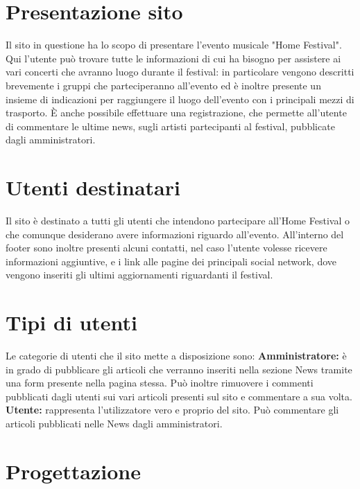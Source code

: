\documentclass[10pt, a4paper]{article}
\begin{document}
\newpage
\hypersetup{hidelinks}
\tableofcontents
\newpage







\section{Presentazione sito}
Il sito in questione ha lo scopo di presentare l'evento musicale "Home Festival". Qui l'utente può trovare tutte le informazioni di cui ha bisogno per assistere ai vari concerti che avranno luogo durante il festival: in particolare vengono descritti brevemente i gruppi che parteciperanno all'evento ed è inoltre presente un insieme di indicazioni per raggiungere il luogo dell'evento con i principali mezzi di trasporto.
È anche possibile effettuare una registrazione, che permette all'utente di commentare le ultime news, sugli artisti partecipanti al festival, pubblicate dagli amministratori. 

\section{Utenti destinatari}
Il sito è destinato a tutti gli utenti che intendono partecipare all’Home Festival o che comunque desiderano avere informazioni riguardo all’evento.  
All’interno del footer sono inoltre presenti alcuni contatti, nel caso l’utente volesse ricevere informazioni aggiuntive, e i link alle pagine dei principali social network, dove vengono inseriti gli ultimi aggiornamenti riguardanti il festival.

\section{Tipi di utenti}
Le categorie di utenti che il sito mette a disposizione sono:
\newline \textbf{Amministratore: }è in grado di pubblicare gli articoli che verranno inseriti nella sezione News tramite una form presente nella pagina stessa. Può inoltre rimuovere i commenti pubblicati dagli utenti sui vari articoli presenti sul sito e commentare a sua volta.
\newline \textbf{Utente: }rappresenta l'utilizzatore vero e proprio del sito. Può commentare gli articoli pubblicati nelle News dagli amministratori.

\section{Progettazione}
\end{document}
